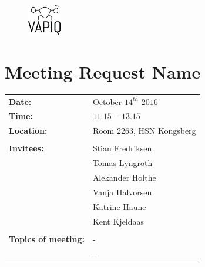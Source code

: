 \documentclass{article}
\begin{document}
\begin{figure}
\begin{center}
\includegraphics[width=0.13\textwidth]{VAPIQ-PICTURES/Logo2_Tilted.png} %
\advance{}
\end{center}
\end{figure}

\section*{Meeting Request Name}   %
\begin{tabular}{ll}            
\textbf{Date:} 	            & October $14^{th}$ $2016$	    \\
\textbf{Time:}	        	& $11.15-13.15$				    \\
\textbf{Location:}       	& Room $2263$, HSN Kongsberg    \\\\
\textbf{Invitees:}          & Stian Fredriksen			    \\
				        	& Tomas Lyngroth			    \\  
				        	& Alekander Holthe 		    	\\
				        	& Vanja Halvorsen		    	\\
				        	& Katrine Haune 		    	\\
				        	& Kent Kjeldaas                 \\\\

\textbf{Topics of meeting:}	& -  \\
                            & -   \\
\end{tabular}                                                       
\end{document}
